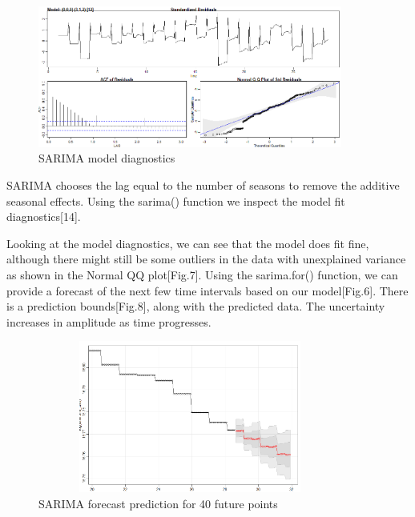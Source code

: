 \documentclass[runningheads]{llncs}
\begin{document}
\begin{figure}
\centering
\includegraphics[scale=1,width=10cm]{Sarima.png} 
\caption{SARIMA model diagnostics}
\end{figure}

SARIMA chooses the lag equal to the number of seasons to remove the additive seasonal effects. Using the sarima() function we inspect the model fit diagnostics[14].

Looking at the model diagnostics, we can see that the model does fit fine, although there might still be some outliers in the data with unexplained variance as shown in the Normal QQ plot[Fig.7].
Using the sarima.for() function, we can provide a forecast of the next few time intervals based on our model[Fig.6]. There is a prediction bounds[Fig.8], along with the predicted data. The uncertainty
increases in amplitude as time progresses.





\begin{figure}
\centering
\includegraphics[scale=1,width=10cm,height=5cm]{SarimaPrediction.png} 
\caption{SARIMA forecast prediction for 40 future points}
\end{figure}
\end{document}
